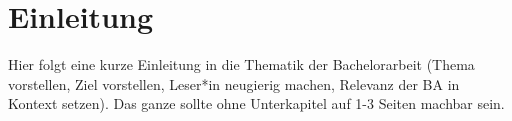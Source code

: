 \chapter{Einleitung}
Hier folgt eine kurze Einleitung in die Thematik der Bachelorarbeit (Thema vorstellen, Ziel vorstellen, Leser*in neugierig machen, Relevanz der BA in Kontext setzen).
Das ganze sollte ohne Unterkapitel auf 1-3 Seiten machbar sein.
